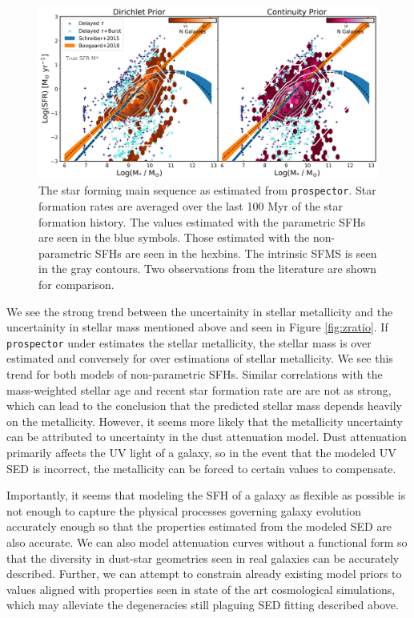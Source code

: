 \documentclass[twocolumn]{aastex62}
\begin{document}
\begin{figure}[h]

\centering
\includegraphics[width=\textwidth]{MS.png}\hfill

\caption{The star forming main sequence as estimated from \texttt{prospector}. Star formation rates are averaged over the last 100 Myr of the star formation history. The values estimated with the parametric SFHs are seen in the blue symbols. Those estimated with the non-parametric SFHs are seen in the hexbins. The intrinsic SFMS is seen in the gray contours. Two observations from the literature are shown for comparison.}
\label{fig:sfms}
\end{figure}

We see the strong trend between the uncertainity in stellar metallicity and the uncertainity in stellar mass mentioned above and seen in Figure \ref{fig:zratio}. If \texttt{prospector} under estimates the stellar metallicity, the stellar mass is over estimated and conversely for over estimations of stellar metallicity. We see this trend for both models of non-parametric SFHs. Similar correlations with the mass-weighted stellar age and recent star formation rate are are not as strong, which can lead to the conclusion that the predicted stellar mass depends heavily on the metallicity. However, it seems more likely that the metallicity uncertainty can be attributed to uncertainty in the dust attenuation model. Dust attenuation primarily affects the UV light of a galaxy, so in the event that the modeled UV SED is incorrect, the metallicity can be forced to certain values to compensate. 

Importantly, it seems that modeling the SFH of a galaxy as flexible as possible is not enough to capture the physical processes governing galaxy evolution accurately enough so that the properties estimated from the modeled SED are also accurate. We can also model attenuation curves without a functional form so that the diversity in dust-star geometries seen in real galaxies can be accurately described. Further, we can attempt to constrain already existing model priors to values aligned with properties seen in state of the art cosmological simulations, which may alleviate the degeneracies still plaguing SED fitting described above. 
\end{document}
